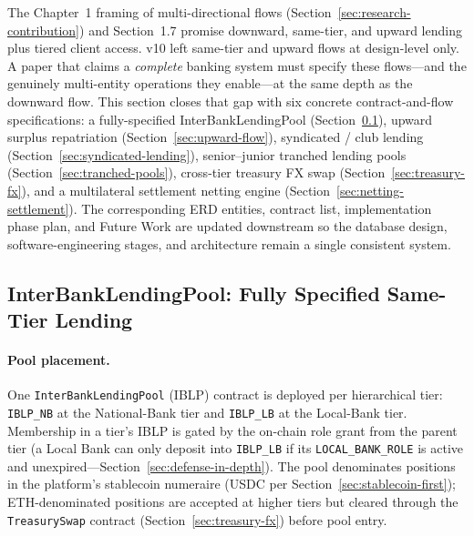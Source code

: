 \documentclass[12pt,a4paper]{report}
\begin{document}
The Chapter~1 framing of multi-directional flows (Section~\ref{sec:research-contribution}) and Section~1.7 promise downward, same-tier, and upward lending plus tiered client access. v10 left same-tier and upward flows at design-level only. A paper that claims a \emph{complete} banking system must specify these flows---and the genuinely multi-entity operations they enable---at the same depth as the downward flow. This section closes that gap with six concrete contract-and-flow specifications: a fully-specified InterBankLendingPool (Section~\ref{sec:interbank-pool}), upward surplus repatriation (Section~\ref{sec:upward-flow}), syndicated / club lending (Section~\ref{sec:syndicated-lending}), senior--junior tranched lending pools (Section~\ref{sec:tranched-pools}), cross-tier treasury FX swap (Section~\ref{sec:treasury-fx}), and a multilateral settlement netting engine (Section~\ref{sec:netting-settlement}). The corresponding ERD entities, contract list, implementation phase plan, and Future Work are updated downstream so the database design, software-engineering stages, and architecture remain a single consistent system.

\subsection{InterBankLendingPool: Fully Specified Same-Tier Lending}
\label{sec:interbank-pool}

\paragraph{Pool placement.}
One \texttt{InterBankLendingPool} (IBLP) contract is deployed per hierarchical tier: \texttt{IBLP\_NB} at the National-Bank tier and \texttt{IBLP\_LB} at the Local-Bank tier. Membership in a tier's IBLP is gated by the on-chain role grant from the parent tier (a Local Bank can only deposit into \texttt{IBLP\_LB} if its \texttt{LOCAL\_BANK\_ROLE} is active and unexpired---Section~\ref{sec:defense-in-depth}). The pool denominates positions in the platform's stablecoin numeraire (USDC per Section~\ref{sec:stablecoin-first}); ETH-denominated positions are accepted at higher tiers but cleared through the \texttt{TreasurySwap} contract (Section~\ref{sec:treasury-fx}) before pool entry.
\end{document}
